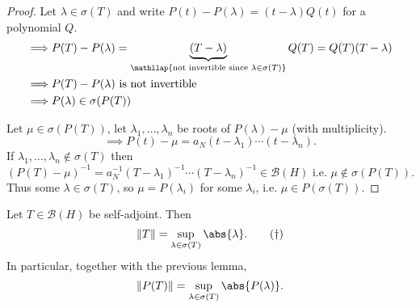 \documentclass{article}
\begin{document}
\begin{proof}
    Let $\lambda \in \sigma(T)$ and write $P(t) - P(\lambda) = (t-\lambda) Q(t)$ for a polynomial $Q$.
    \begin{align*}
        \implies& P(T) - P(\lambda) = \underbrace{(T-\lambda)}_{\mathllap{\text{not invertible since } \lambda \in \sigma(T)}} Q(T) = Q(T) (T - \lambda) \\
        \implies& P(T) - P(\lambda) \text{ is not invertible} \\
        \implies& P(\lambda) \in \sigma(P(T))
    \end{align*}

    Let $\mu \in \sigma(P(T))$, let $\lambda_1, \dotsc, \lambda_n$ be roots of $P(\lambda) - \mu$ (with multiplicity).
    \begin{equation*}
        \implies P(t) - \mu = a_N (t-\lambda_1) \dotsm (t - \lambda_n).
    \end{equation*}
    If $\lambda_1, \dotsc, \lambda_n \notin \sigma(T)$ then
    \begin{equation*}
        (P(T) - \mu)^{-1} = a_N^{-1} (T - \lambda_1)^{-1} \dotsm (T - \lambda_n)^{-1} \in \mathcal{B}(H) \text{ i.e. } \mu \notin \sigma(P(T)).
    \end{equation*}
    Thus some $\lambda \in \sigma(T)$, so $\mu = P(\lambda_i)$ for some $\lambda_i$, i.e. $\mu \in P(\sigma(T))$.
\end{proof}

\begin{lemma}
    Let $T \in \mathcal{B}(H)$ be self-adjoint. Then
    \begin{equation*}
        \|T\| = \sup_{\lambda \in \sigma(T)} \abs{\lambda}. \label{eq:24dagger} \tag{$\dagger$}
    \end{equation*}
    In particular, together with the previous lemma,
    \begin{equation*}
        \|P(T)\| = \sup_{\lambda \in \sigma(T)} \abs{P(\lambda)}.
    \end{equation*}
\end{lemma}
\end{document}
